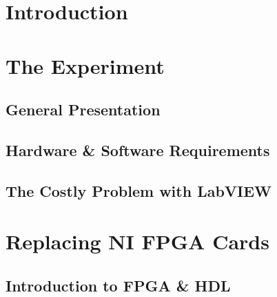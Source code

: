 \documentclass[12pt,a4paper]{report}
\begin{document}
\label{chap:0_1_title}

\chapter*{Introduction}\label{chap:0_2_introduction}


\clearpage
\tableofcontents

\clearpage
\chapter{The Experiment}\label{chap:1_experiment}


\section{General Presentation}\label{sec:1_1_general}


\section{Hardware \& Software Requirements}\label{sec:1_2_sw_hw}


\section{The Costly Problem with LabVIEW}\label{sec:1_3_problem}


\clearpage
\chapter{Replacing NI FPGA Cards}\label{chap:2_replace}


\section{Introduction to FPGA \& HDL}\label{sec:2_1_fpga_hdl}


\end{document}
